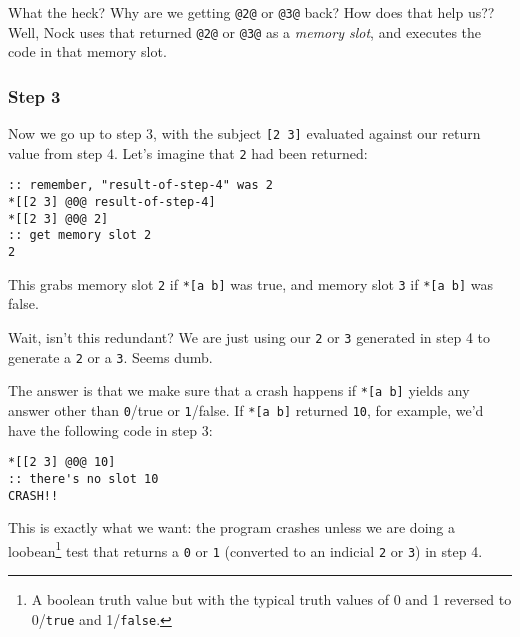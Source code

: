 \documentclass[twoside]{article}
\begin{document}
What the heck? Why are we getting \lstinline[style=inlinecode]{@2@} or \lstinline[style=inlinecode]{@3@} back? How does that help us?? Well, Nock uses that returned \lstinline[style=inlinecode]{@2@} or \lstinline[style=inlinecode]{@3@} as a \emph{memory slot}, and executes the code in that memory slot.

\subsubsection{Step 3}

Now we go up to step 3, with the subject \lstinline[style=inlinecode]{[2 3]} evaluated against our return value from step 4.  Let's imagine that \lstinline[style=inlinecode]{2} had been returned:

\begin{lstlisting}[style=listingblock]
:: remember, "result-of-step-4" was 2
*[[2 3] @0@ result-of-step-4]
*[[2 3] @0@ 2]
:: get memory slot 2
2
\end{lstlisting}

This grabs memory slot \lstinline[style=inlinecode]{2} if \lstinline[style=inlinecode]{*[a b]} was true, and memory slot \lstinline[style=inlinecode]{3} if \lstinline[style=inlinecode]{*[a b]} was false.

Wait, isn't this redundant? We are just using our \lstinline[style=inlinecode]{2} or \lstinline[style=inlinecode]{3} generated in step 4 to generate a \lstinline[style=inlinecode]{2} or a \lstinline[style=inlinecode]{3}. Seems dumb.

The answer is that we make sure that a crash happens if \lstinline[style=inlinecode]{*[a b]} yields any answer other than \lstinline[style=inlinecode]{0}/true or \lstinline[style=inlinecode]{1}/false.  If \lstinline[style=inlinecode]{*[a b]} returned \lstinline[style=inlinecode]{10}, for example, we'd have the following code in step 3:

\begin{lstlisting}[style=listingblock]
*[[2 3] @0@ 10]
:: there's no slot 10
CRASH!!
\end{lstlisting}

This is exactly what we want: the program crashes unless we are doing a loobean\footnote{A boolean truth value but with the typical truth values of 0 and 1 reversed to 0/\texttt{true} and 1/\texttt{false}.} test that returns a \lstinline[style=inlinecode]{0} or \lstinline[style=inlinecode]{1} (converted to an indicial \lstinline[style=inlinecode]{2} or \lstinline[style=inlinecode]{3}) in step 4.
\end{document}
